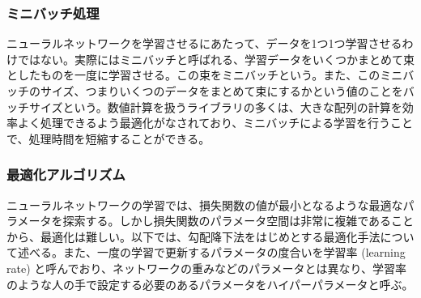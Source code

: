 \subsubsection{ミニバッチ処理}
ニューラルネットワークを学習させるにあたって、データを1つ1つ学習させるわけではない。実際にはミニバッチと呼ばれる、学習データをいくつかまとめて束としたものを一度に学習させる。この束をミニバッチという。また、このミニバッチのサイズ、つまりいくつのデータをまとめて束にするかという値のことをバッチサイズという。数値計算を扱うライブラリの多くは、大きな配列の計算を効率よく処理できるよう最適化がなされており、ミニバッチによる学習を行うことで、処理時間を短縮することができる。
\subsubsection{最適化アルゴリズム}
ニューラルネットワークの学習では、損失関数の値が最小となるような最適なパラメータを探索する。しかし損失関数のパラメータ空間は非常に複雑であることから、最適化は難しい。以下では、勾配降下法をはじめとする最適化手法について述べる。また、一度の学習で更新するパラメータの度合いを学習率 (learning rate) と呼んでおり、ネットワークの重みなどのパラメータとは異なり、学習率のような人の手で設定する必要のあるパラメータをハイパーパラメータと呼ぶ。
